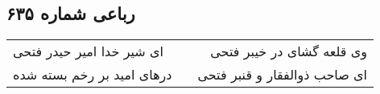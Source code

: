 \begin{center}
\section*{رباعی شماره ۶۳۵}
\label{sec:sh635}
\begin{longtable}{l p{0.5cm} r}
ای شیر خدا امیر حیدر فتحی
&&
وی قلعه گشای در خیبر فتحی
\\
درهای امید بر رخم بسته شده
&&
ای صاحب ذوالفقار و قنبر فتحی
\\
\end{longtable}
\end{center}
